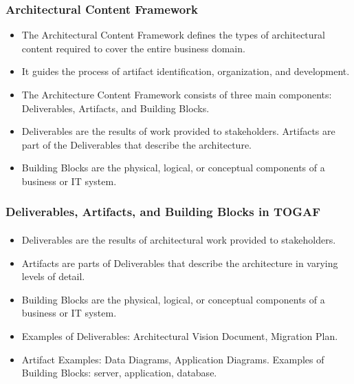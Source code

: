 \documentclass[aspectratio=169, table]{beamer}
\begin{document}
    \begin{frame}
        \frametitle{Architectural Content Framework}
        \begin{itemize}
            \item The Architectural Content Framework defines the types of architectural content required to cover the entire business domain.
            \item It guides the process of artifact identification, organization, and development.
            \item The Architecture Content Framework consists of three main components: Deliverables, Artifacts, and Building Blocks.
            \item Deliverables are the results of work provided to stakeholders. Artifacts are part of the Deliverables that describe the architecture.
            \item Building Blocks are the physical, logical, or conceptual components of a business or IT system.
        \end{itemize}
    \end{frame}



    \begin{frame}
        \frametitle{Deliverables, Artifacts, and Building Blocks in TOGAF}
        \framesubtitle{\hspace{1cm}}
        \begin{itemize}
            \item Deliverables are the results of architectural work provided to stakeholders.
            \item Artifacts are parts of Deliverables that describe the architecture in varying levels of detail.
            \item Building Blocks are the physical, logical, or conceptual components of a business or IT system.
            \item Examples of Deliverables: Architectural Vision Document, Migration Plan.
            \item Artifact Examples: Data Diagrams, Application Diagrams. Examples of Building Blocks: server, application, database.
        \end{itemize}
    \end{frame}
\end{document}
